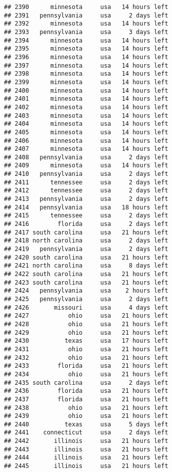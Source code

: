 \documentclass[
]{article}
\begin{document}
\begin{verbatim}
## 2390      minnesota     usa   14 hours left
## 2391   pennsylvania     usa     2 days left
## 2392      minnesota     usa   14 hours left
## 2393   pennsylvania     usa     3 days left
## 2394      minnesota     usa   14 hours left
## 2395      minnesota     usa   14 hours left
## 2396      minnesota     usa   14 hours left
## 2397      minnesota     usa   14 hours left
## 2398      minnesota     usa   14 hours left
## 2399      minnesota     usa   14 hours left
## 2400      minnesota     usa   14 hours left
## 2401      minnesota     usa   14 hours left
## 2402      minnesota     usa   14 hours left
## 2403      minnesota     usa   14 hours left
## 2404      minnesota     usa   14 hours left
## 2405      minnesota     usa   14 hours left
## 2406      minnesota     usa   14 hours left
## 2407      minnesota     usa   14 hours left
## 2408   pennsylvania     usa     2 days left
## 2409      minnesota     usa   14 hours left
## 2410   pennsylvania     usa     2 days left
## 2411      tennessee     usa     2 days left
## 2412      tennessee     usa     2 days left
## 2413   pennsylvania     usa     2 days left
## 2414   pennsylvania     usa   18 hours left
## 2415      tennessee     usa     2 days left
## 2416        florida     usa     2 days left
## 2417 south carolina     usa   21 hours left
## 2418 north carolina     usa     2 days left
## 2419   pennsylvania     usa     2 days left
## 2420 south carolina     usa   21 hours left
## 2421 north carolina     usa     8 days left
## 2422 south carolina     usa   21 hours left
## 2423 south carolina     usa   21 hours left
## 2424   pennsylvania     usa    2 hours left
## 2425   pennsylvania     usa     2 days left
## 2426       missouri     usa     4 days left
## 2427           ohio     usa   21 hours left
## 2428           ohio     usa   21 hours left
## 2429           ohio     usa   21 hours left
## 2430          texas     usa   17 hours left
## 2431           ohio     usa   21 hours left
## 2432           ohio     usa   21 hours left
## 2433        florida     usa   21 hours left
## 2434           ohio     usa   21 hours left
## 2435 south carolina     usa     2 days left
## 2436        florida     usa   21 hours left
## 2437        florida     usa   21 hours left
## 2438           ohio     usa   21 hours left
## 2439           ohio     usa   21 hours left
## 2440          texas     usa     5 days left
## 2441    connecticut     usa     2 days left
## 2442       illinois     usa   21 hours left
## 2443       illinois     usa   21 hours left
## 2444       illinois     usa   21 hours left
## 2445       illinois     usa   21 hours left

\end{verbatim}
\end{document}
